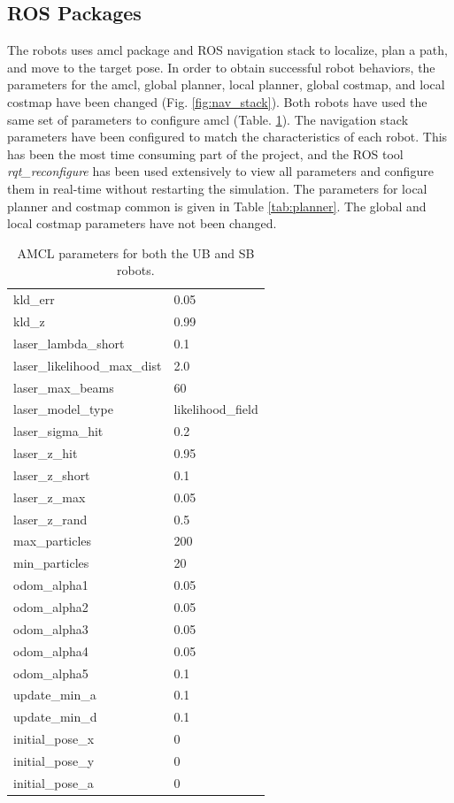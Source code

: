 \documentclass[10pt,journal,compsoc]{IEEEtran}
\begin{document}
\subsection{ROS Packages}

The robots uses amcl package and ROS navigation stack to localize, plan a path, and move to the target pose.  In order to obtain successful robot behaviors, the parameters for the amcl, global planner, local planner, global costmap, and local costmap have been changed (Fig. \ref{fig:nav_stack}).   Both robots have used the same set of parameters to configure amcl (Table. \ref{tab:amcl_loc}).  The navigation stack parameters have been configured to match the characteristics of each robot. This has been the most time consuming part of the project, and the ROS tool \textit{rqt\_reconfigure} has been used extensively to view all parameters and configure them in real-time without restarting the simulation. The parameters for local planner and costmap common is given in Table \ref{tab:planner}. The global and local costmap parameters have not been changed.

\begin{table}[h]
\caption{AMCL parameters for both the UB and SB robots.}
\label{tab:amcl_loc}
\begin{center}
\begin{tabular}{|l|l|}
\hline
kld\_err & 0.05\\
kld\_z & 0.99\\
laser\_lambda\_short & 0.1 \\
laser\_likelihood\_max\_dist & 2.0\\
laser\_max\_beams & 60 \\
laser\_model\_type &  likelihood\_field\\
laser\_sigma\_hit & 0.2\\
laser\_z\_hit & 0.95\\
laser\_z\_short & 0.1 \\
laser\_z\_max & 0.05 \\
laser\_z\_rand & 0.5\\
max\_particles & 200\\
min\_particles & 20\\
odom\_alpha1 & 0.05\\
odom\_alpha2& 0.05\\
odom\_alpha3& 0.05\\
odom\_alpha4& 0.05\\
odom\_alpha5& 0.1\\
update\_min\_a & 0.1\\
update\_min\_d & 0.1 \\
initial\_pose\_x & 0\\
initial\_pose\_y & 0\\
initial\_pose\_a & 0\\
\hline
\end{tabular}
\end{center}
\end{table}
\end{document}
